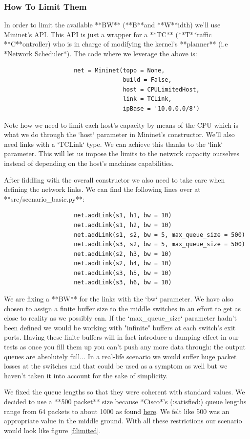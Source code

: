 \documentclass[12pt]{report}
\newcommand{\newpar} {
    \vskip 1cm
}
\begin{document}
			\subsubsection{How To Limit Them}
				In order to limit the available **BW** (**B**and **W**idth) we'll use Mininet's API. This API is just a wrapper for a **TC** (**T**raffic **C**ontroller) who is in charge of modifying the kernel's **planner** (i.e *Network Scheduler*). The code where we leverage the above is:

				\begin{verbatim}
					net = Mininet(topo = None,
								  build = False,
								  host = CPULimitedHost,
								  link = TCLink,
								  ipBase = '10.0.0.0/8')
				\end{verbatim}

				Note how we need to limit each host's capacity by means of the CPU which is what we do through the `host` parameter in Mininet's constructor. We'll also need links with a `TCLink` type. We can achieve this thanks to the `link` parameter. This will let us impose the limits to the network capacity ourselves instead of depending on the host's machines capabilities.
				\newpar
				After fiddling with the overall constructor we also need to take care when defining the network links. We can find the following lines over at **src/scenario_basic.py**:

				\begin{verbatim}
					net.addLink(s1, h1, bw = 10)
					net.addLink(s1, h2, bw = 10)
					net.addLink(s1, s2, bw = 5, max_queue_size = 500)
					net.addLink(s3, s2, bw = 5, max_queue_size = 500)
					net.addLink(s2, h3, bw = 10)
					net.addLink(s2, h4, bw = 10)
					net.addLink(s3, h5, bw = 10)
					net.addLink(s3, h6, bw = 10)
				\end{verbatim}

				We are fixing a **BW** for the links with the `bw` parameter. We have also chosen to assign a finite buffer size to the middle switches in an effort to get as close to reality as we possibly can. If the `max_queue_size` parameter hadn't been defined we would be working with "infinite" buffers at each switch's exit ports. Having these finite buffers will in fact introduce a damping effect in our tests as once you fill them up you can't push any more data through: the output queues are absolutely full... In a real-life scenario we would suffer huge packet losses at the switches and that could be used as a symptom as well but we haven't taken it into account for the sake of simplicity.
				\newpar
				We fixed the queue lengths so that they were coherent with standard values. We decided to use a **500 packet** size because *Cisco*'s (:satisfied:) queue lengths range from 64 packets to about 1000 as found \href{https://www.cisco.com/c/en/us/support/docs/routers/7200-series-routers/110850-queue-limit-output-drops-ios.html}{here}. We felt like 500 was an appropriate value in the middle ground. With all these restrictions our scenario would look like figure \ref{f:limited}.
\end{document}
